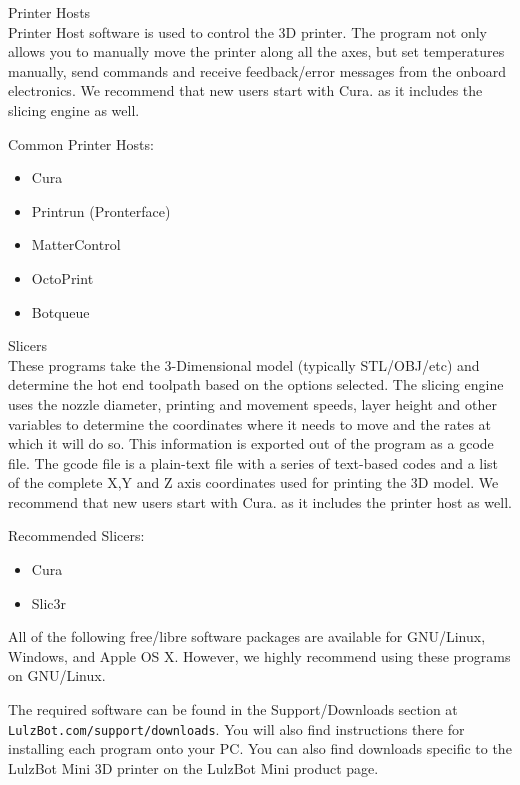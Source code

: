 \begin{description}
\item{Printer Hosts} \hfill \\
Printer Host software is used to control the 3D printer. The program not only allows you to manually move the printer along all the axes, but set temperatures manually, send commands and receive feedback/error messages from the onboard electronics. We recommend that new users start with Cura. as it includes the slicing engine as well.

Common Printer Hosts:
\begin{itemize}
\item Cura
\item Printrun (Pronterface)
\item MatterControl
\item OctoPrint
\item Botqueue
\end{itemize}

\item{Slicers} \hfill \\
These programs take the 3-Dimensional model (typically STL/OBJ/etc) and determine the hot end toolpath based on the options selected. The slicing engine uses the nozzle diameter, printing and movement speeds, layer height and other variables to determine the coordinates where it needs to move and the rates at which it will do so. This information is exported out of the program as a gcode file. The gcode file is a plain-text file with a series of text-based codes and a list of the complete X,Y and Z axis coordinates used for printing the 3D model. We recommend that new users start with Cura. as it includes the printer host as well.

Recommended Slicers:
\begin{itemize}
\item Cura
\item Slic3r
\end{itemize}

\end{description}

All of the following free/libre software packages are available for GNU/Linux, Windows, and Apple OS X. However, we highly recommend using these programs on GNU/Linux.

The required software can be found in the Support/Downloads section at \texttt{LulzBot.com/support/downloads}. You will also find instructions there for installing each program onto your PC. You can also find downloads specific to the LulzBot\textsuperscript{\miniscule{\texttrademark}} Mini 3D printer on the LulzBot\textsuperscript{\miniscule{\texttrademark}} Mini product page.

